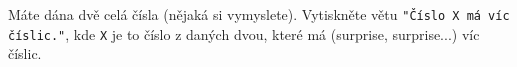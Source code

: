 \question[30]
Máte dána dvě celá čísla (nějaká si vymyslete). Vytiskněte větu \texttt{"Číslo X
	má víc číslic."}, kde
\texttt{X} je to číslo z daných dvou, které má (surprise,
surprise...) víc číslic.
